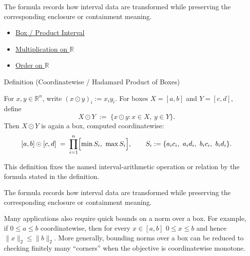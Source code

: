 \begin{remark*}[Interpretation]
The formula records how interval data are transformed while preserving the
corresponding enclosure or containment meaning.
\end{remark*}

\begin{dependencies}
\begin{itemize}
  \item \hyperref[def:product-interval-box]{Box / Product Interval}
  \item \hyperref[def:multiplication-on-r]{Multiplication on $\mathbb{R}$}
  \item \hyperref[def:order-on-r]{Order on $\mathbb{R}$}
\end{itemize}
\end{dependencies}

\begin{definitionbox}{Definition (Coordinatewise / Hadamard Product of Boxes)}
\begin{definition}\label{def:box-hadamard}
For $x,y\in\mathbb{R}^n$, write $(x\odot y)_i := x_i y_i$.
For boxes $X=[a,b]$ and $Y=[c,d]$, define
\[
X\odot Y \;:=\; \{x\odot y : x\in X,\ y\in Y\}.
\]
Then $X\odot Y$ is again a box, computed coordinatewise:
\[
[a,b]\odot[c,d] \;=\; \prod_{i=1}^n \Bigl[\min S_i,\ \max S_i\Bigr],
\qquad
S_i:=\{a_ic_i,\ a_id_i,\ b_ic_i,\ b_id_i\}.
\]
\end{definition}
\end{definitionbox}

\begin{remark*}
This definition fixes the named interval-arithmetic operation or relation by
the formula stated in the definition.
\end{remark*}

\begin{remark*}[Interpretation]
The formula records how interval data are transformed while preserving the
corresponding enclosure or containment meaning.
\end{remark*}

\begin{remark*}[Exposition]
Many applications also require quick bounds on a norm over a box.
For example, if $0\le a\le b$ coordinatewise, then for every $x\in[a,b]$
$0\le x\le b$ and hence $\|x\|_2\le \|b\|_2$. More generally, bounding norms over
a box can be reduced to checking finitely many ``corners'' when the objective is
coordinatewise monotone.
\end{remark*}

